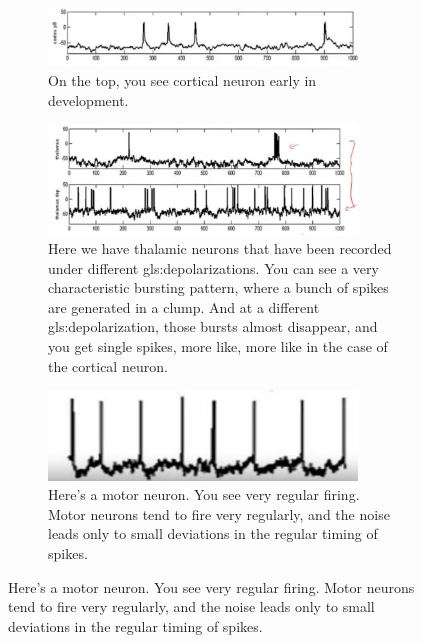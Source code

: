 \documentclass[]{article}
\begin{document}
\begin{figure}[H]
	\caption[The electrical personalities of neurons]{The electrical personalities of neurons.}
	\begin{subfigure}[t]{0.9\textwidth}
		\caption{On the top, you see cortical neuron early in development.}
		\includegraphics[width=0.9\textwidth]{electrical-personalities1}
	\end{subfigure}
	\begin{subfigure}[t]{0.9\textwidth}
		\caption{Here we have thalamic neurons that have been recorded under different \glspl{gls:depolarization}. You can see a very characteristic bursting pattern, where a bunch of spikes are generated in a clump. And at a different \gls{gls:depolarization}, those bursts almost disappear, and you get single spikes, more like, more like in	the case of the cortical neuron.}
	\includegraphics[width=0.9\textwidth]{electrical-personalities2}
	\end{subfigure}
	\begin{subfigure}[t]{0.9\textwidth}
		\caption{Here's a motor neuron. You see very regular firing. Motor neurons tend to fire very regularly, and the noise leads only to small deviations in the regular timing of spikes.}
		\includegraphics[width=0.9\textwidth]{electrical-personalities3}
	\end{subfigure}
\end{figure}
\end{document}
